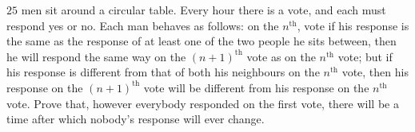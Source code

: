 $25$ men sit around a circular table. Every hour there is a vote, and each must respond yes or no. Each man behaves as follows: on the $n^{\text{th}}$,  vote if his response is the same as the response of at least one of the two people he sits between, then he will respond the same way on the $(n+1)^{\text{th}}$ vote as on the $n^{\text{th}}$ vote; but if his response is different from that of both his neighbours on the $n^{\text{th}}$ vote, then his response on the $(n+1)^{\text{th}}$ vote will be different from his response on the $n^{\text{th}}$ vote. Prove that, however everybody responded on the first vote, there will be a time after which nobody's response will ever change.
